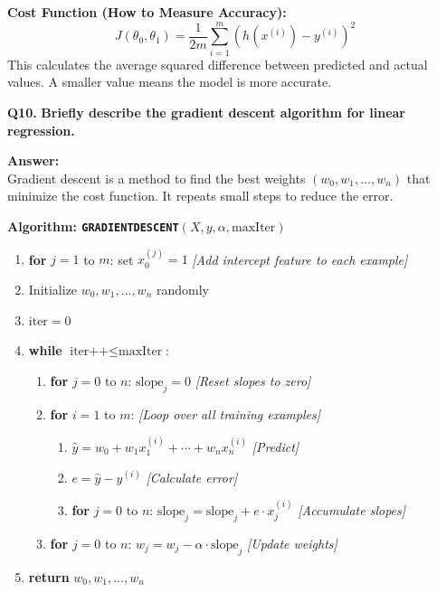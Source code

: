 \documentclass[12pt,a4paper]{article}
\newcommand{\question}[2]{%
    \begin{mdframed}[style=questionstyle]
        \textbf{\textcolor{headerblue}{Q#1.}} \textbf{#2}
    \end{mdframed}%
    \vspace{2pt}%
}
\newcommand{\ans}{\textbf{\textcolor{headerblue}{Answer:}}\\[4pt]}
\newcommand{\subhead}[1]{\textbf{\textcolor{headerblue}{#1}}}
\begin{document}
\subhead{Cost Function (How to Measure Accuracy):}
\[
J(\theta_0, \theta_1) = \frac{1}{2m} \sum_{i=1}^{m} \left(h(x^{(i)}) - y^{(i)}\right)^2
\]
This calculates the average squared difference between predicted and actual values. A smaller value means the model is more accurate.

\vspace{10pt}
\question{10}{Briefly describe the gradient descent algorithm for linear regression.}

\ans

Gradient descent is a method to find the best weights $(w_0, w_1, \ldots, w_n)$ that minimize the cost function. It repeats small steps to reduce the error.

\subhead{Algorithm: \texttt{GRADIENTDESCENT}$(X, y, \alpha, \text{maxIter})$}

\begin{enumerate}[leftmargin=*]
    \item \textbf{for} $j = 1$ to $m$: set $x_0^{(j)} = 1$ \hfill \textit{[Add intercept feature to each example]}
    \item Initialize $w_0, w_1, \ldots, w_n$ randomly
    \item $\text{iter} = 0$
    \item \textbf{while} $\text{iter++} \leq \text{maxIter}$:
    \begin{enumerate}
        \item \textbf{for} $j = 0$ to $n$: $\text{slope}_j = 0$ \hfill \textit{[Reset slopes to zero]}
        \item \textbf{for} $i = 1$ to $m$: \hfill \textit{[Loop over all training examples]}
        \begin{enumerate}
            \item $\hat{y} = w_0 + w_1 x_1^{(i)} + \cdots + w_n x_n^{(i)}$ \hfill \textit{[Predict]}
            \item $e = \hat{y} - y^{(i)}$ \hfill \textit{[Calculate error]}
            \item \textbf{for} $j = 0$ to $n$: $\text{slope}_j = \text{slope}_j + e \cdot x_j^{(i)}$ \hfill \textit{[Accumulate slopes]}
        \end{enumerate}
        \item \textbf{for} $j = 0$ to $n$: $w_j = w_j - \alpha \cdot \text{slope}_j$ \hfill \textit{[Update weights]}
    \end{enumerate}
    \item \textbf{return} $w_0, w_1, \ldots, w_n$
\end{enumerate}
\end{document}
